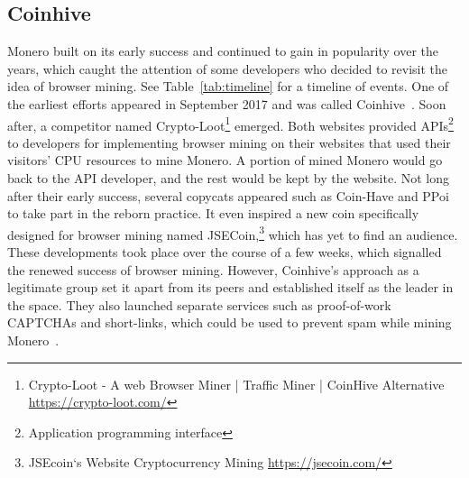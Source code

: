 \subsection{Coinhive}



Monero built on its early success and continued to gain in popularity over the years, which caught the attention of some developers who decided to revisit the idea of browser mining. See Table~\ref{tab:timeline} for a timeline of events.  One of the earliest efforts appeared in September 2017 and was called Coinhive~\cite{coinhive}. Soon after, a competitor named Crypto-Loot\footnote{Crypto-Loot - A web Browser Miner | Traffic Miner | CoinHive Alternative \url{https://crypto-loot.com/}} emerged. Both websites provided APIs\footnote{Application programming interface} to developers for implementing browser mining on their websites that used their visitors' CPU resources to mine Monero. A portion of mined Monero would go back to the API developer, and the rest would be kept by the website. Not long after their early success, several copycats appeared such as Coin-Have and PPoi~\cite{coinhivecopycats} to take part in the reborn practice. It even inspired a new coin specifically designed for browser mining named JSECoin,\footnote{JSEcoin`s Website Cryptocurrency Mining \url{https://jsecoin.com/}} which has yet to find an audience. These developments took place over the course of a few weeks, which signalled the renewed success of browser mining. However, Coinhive's approach as a legitimate group set it apart from its peers and established itself as the leader in the space. They also launched separate services such as proof-of-work CAPTCHAs and short-links, which could be used to prevent spam while mining Monero~\cite{coinhive}.

%
%
%
%
%
%
